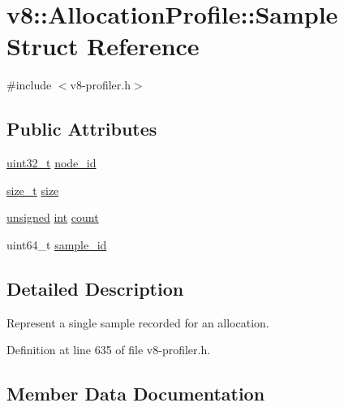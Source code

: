 \hypertarget{structv8_1_1AllocationProfile_1_1Sample}{}\section{v8\+:\+:Allocation\+Profile\+:\+:Sample Struct Reference}
\label{structv8_1_1AllocationProfile_1_1Sample}


{\ttfamily \#include $<$v8-\/profiler.\+h$>$}

\subsection*{Public Attributes}
\begin{DoxyCompactItemize}
\item 
\mbox{\hyperlink{classuint32__t}{uint32\+\_\+t}} \mbox{\hyperlink{structv8_1_1AllocationProfile_1_1Sample_ab84cfd942c2b6d42f25874b5008cfc35}{node\+\_\+id}}
\item 
\mbox{\hyperlink{classsize__t}{size\+\_\+t}} \mbox{\hyperlink{structv8_1_1AllocationProfile_1_1Sample_aa8775ce782c6fcc5a20922f604190dd5}{size}}
\item 
\mbox{\hyperlink{classunsigned}{unsigned}} \mbox{\hyperlink{classint}{int}} \mbox{\hyperlink{structv8_1_1AllocationProfile_1_1Sample_a0c121684db4adc4e4757b85d919bb0e7}{count}}
\item 
uint64\+\_\+t \mbox{\hyperlink{structv8_1_1AllocationProfile_1_1Sample_afc21641115d4a9684363ac873750422c}{sample\+\_\+id}}
\end{DoxyCompactItemize}


\subsection{Detailed Description}
Represent a single sample recorded for an allocation. 

Definition at line 635 of file v8-\/profiler.\+h.



\subsection{Member Data Documentation}
\mbox{\label{structv8_1_1AllocationProfile_1_1Sample_a0c121684db4adc4e4757b85d919bb0e7}} 

